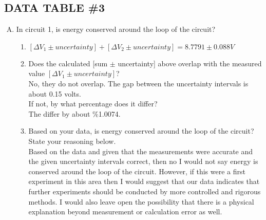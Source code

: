 \subsection{DATA TABLE \#3}
	\begin{enumerate}[A.]
		\item In circuit 1, is energy conserved around the loop of the circuit? \\
		\begin{enumerate}[1.]
			\item $[\Delta V_1 \pm uncertainty] + [\Delta V_2 \pm uncertainty] = 8.7791 \pm 0.088 V$ 
			
			\item Does the calculated [sum $\pm$ uncertainty] above overlap with the measured value $[\Delta V_1 \pm uncertainty]$?\\
			
			No, they do not overlap.  The gap between the uncertainty intervals is about 0.15 volts.\\
			
			If not, by what percentage does it differ?\\
			
			The differ by about \%1.0074.
			
			\item Based on your data, is energy conserved around the loop of the circuit?  State your reasoning below.\\
			
			Based on the data and given that the measurements were accurate and the given uncertainty intervals correct, then no I would not say energy is conserved around the loop of the circuit.  However, if this were a first experiment in this area then I would suggest that our data indicates that further experiments should be conducted by more controlled and rigorous methods.  I would also leave open the possibility that there is a physical explanation beyond measurement or calculation error as well.\\
			
		\end{enumerate}
	\end{enumerate}
	
					
			
			